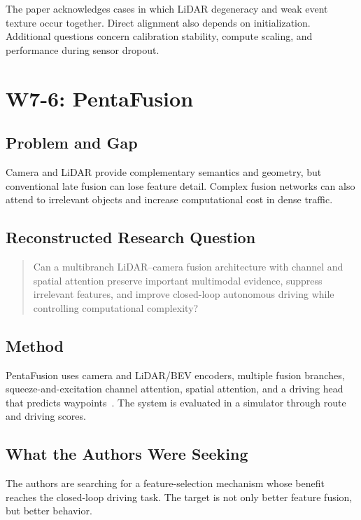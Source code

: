 The paper acknowledges cases in which LiDAR degeneracy and weak event texture occur together. Direct alignment also depends on initialization. Additional questions concern calibration stability, compute scaling, and performance during sensor dropout.

\section{W7-6: PentaFusion}

\subsection{Problem and Gap}

Camera and LiDAR provide complementary semantics and geometry, but conventional late fusion can lose feature detail. Complex fusion networks can also attend to irrelevant objects and increase computational cost in dense traffic.

\subsection{Reconstructed Research Question}

\begin{quote}
Can a multibranch LiDAR--camera fusion architecture with channel and spatial attention preserve important multimodal evidence, suppress irrelevant features, and improve closed-loop autonomous driving while controlling computational complexity?
\end{quote}

\subsection{Method}

PentaFusion uses camera and LiDAR/BEV encoders, multiple fusion branches, squeeze-and-excitation channel attention, spatial attention, and a driving head that predicts waypoints~\cite{zhang2026pentafusion}. The system is evaluated in a simulator through route and driving scores.

\subsection{What the Authors Were Seeking}

The authors are searching for a feature-selection mechanism whose benefit reaches the closed-loop driving task. The target is not only better feature fusion, but better behavior.

